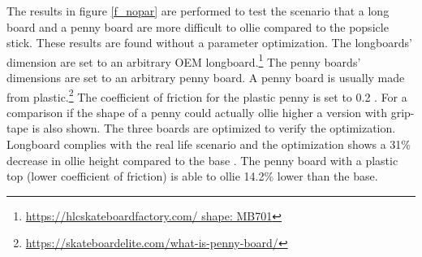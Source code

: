 \documentclass[default,iicol]{sn-jnl}
\begin{document}
       

\noindent The results in figure \ref{f_nopar} are performed to test the scenario that a long board and a penny board are more difficult to ollie compared to the popsicle stick. These results are found without a parameter optimization. The longboards' dimension are set to an arbitrary OEM longboard.\footnote{\url{https://hlcskateboardfactory.com/ shape: MB701}} The penny boards' dimensions are set to an arbitrary penny board. A penny board is usually made from plastic.\footnote{\url{https://skateboardelite.com/what-is-penny-board/}} The coefficient of friction for the plastic penny is set to 0.2 \cite{bani-hani_data_2019}. For a comparison if the shape of a penny could actually ollie higher a version with grip-tape is also shown. The three boards are optimized to verify the optimization. Longboard complies with the real life scenario and the optimization shows a 31\% decrease in ollie height compared to the base . The penny board with a plastic top (lower coefficient of friction) is able to ollie 14.2\% lower than the base.
\end{document}
